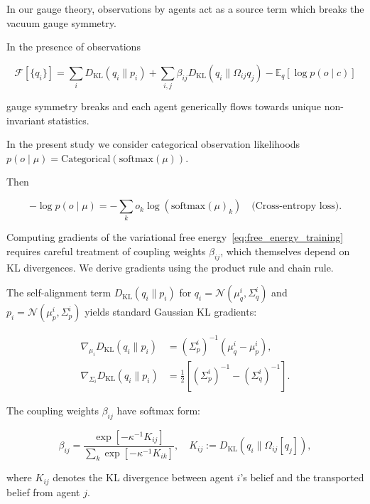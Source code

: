 \documentclass[twoside,11pt]{article}
\begin{document}
In our gauge theory, observations by agents act as a source term which breaks the vacuum gauge symmetry.

In the presence of observations   

\begin{equation}
\mathcal{F}[\{q_i\}] =
\sum_i D_{\mathrm{KL}}(q_i \| p_i)
+ \sum_{i,j} \beta_{ij} D_{\mathrm{KL}}(q_i \| \Omega_{ij} q_j)
- \mathbb{E}_q[\log p(o \mid c)]
\label{eq:free_energy_training}
\end{equation}

gauge symmetry breaks and each agent generically flows towards unique non-invariant statistics.  

In the present study we consider categorical observation likelihoods $p(o \mid \mu) = \mathrm{Categorical}(\mathrm{softmax}(\mu))$.

Then

\begin{equation}
-\log p(o \mid \mu) = -\sum_k o_k \log(\mathrm{softmax}(\mu)_k) \quad \text{(Cross-entropy loss)}.
\end{equation}



Computing gradients of the variational free energy~\eqref{eq:free_energy_training} requires careful treatment of coupling weights $\beta_{ij}$, which themselves depend on KL divergences. We derive gradients using the product rule and chain rule.

The self-alignment term $D_{\mathrm{KL}}(q_i \| p_i)$ for $q_i = \mathcal{N}(\mu_q^i, \Sigma_q^i)$ and $p_i = \mathcal{N}(\mu_p^i, \Sigma_p^i)$ yields standard Gaussian KL gradients:

\begin{align}
\nabla_{\mu_i} D_{\mathrm{KL}}(q_i \| p_i) &= (\Sigma_p^i)^{-1}(\mu_q^i - \mu_p^i), \label{eq:grad_mu_self} \\
\nabla_{\Sigma_i} D_{\mathrm{KL}}(q_i \| p_i) &= \tfrac{1}{2}\left[(\Sigma_p^i)^{-1} - (\Sigma_q^i)^{-1}\right]. \label{eq:grad_sigma_self}
\end{align}

The coupling weights $\beta_{ij}$ have softmax form:

\begin{equation}
\beta_{ij} = \frac{\exp\!\left[-\kappa^{-1} K_{ij}\right]}{\sum_k \exp\!\left[-\kappa^{-1} K_{ik}\right]},
\quad K_{ij} := D_{\mathrm{KL}}(q_i \| \Omega_{ij}[q_j]),
\label{eq:beta_def}
\end{equation}

where $K_{ij}$ denotes the KL divergence between agent $i$'s belief and the transported belief from agent $j$. 
\end{document}
